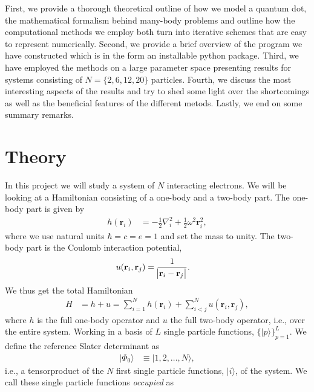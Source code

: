 \documentclass[
    a4paper, aps, twocolumn, floatfix, superscriptaddress,
    nofootinbib]{revtex4-1}
\newcommand{\vf}{\mathbf}
\newcommand{\1}{\mathds{1}}
\newcommand{\half}{\frac{1}{2}}
\newcommand{\ket}[1]{\rvert #1\rangle}
\begin{document}
    First, we provide a thorough theoretical outline of how we model a quantum dot, 
    the mathematical formalism behind many-body problems and outline how the 
    computational methods we employ both turn into iterative schemes that are 
    easy to represent numerically. Second, we provide a brief overview of the
    program we have constructed which is in the form an installable python package.
    Third, we have employed the methods on a large parameter space presenting 
    results for systems consisting of $N= \{2, 6, 12, 20\}$ particles. Fourth,
    we discuss the most interesting aspects of the results and try to shed some
    light over the shortcomings as well as the beneficial features of the different
    metods. Lastly, we end on some summary remarks. 

\section{Theory}
    In this project we will study a system of $N$ interacting electrons. We will
    be looking at a Hamiltonian consisting of a one-body and a two-body part.
    The one-body part is given by
    \begin{align}
        h(\vf{r}_i)
        &= -\half\nabla_i^2 + \half\omega^2 \vf{r}_i^2,
        \label{eq:one_body_hamiltonian}
    \end{align}
    where we use natural units $\hbar = c = e = 1$ and set the mass to unity.
    The two-body part is the Coulomb interaction potential,
    \begin{align}
        u(\vf{r}_i, \vf{r}_j)
        &= \frac{1}{\abs{\vf{r}_i - \vf{r}_j}}.
        \label{eq:two_body_operator}
    \end{align}
    We thus get the total Hamiltonian
    \begin{align}
        H &= h + u
        =
        \sum_{i = 1}^N h(\vf{r}_i) + \sum_{i < j}^N u(\vf{r}_i, \vf{r}_j),
    \end{align}
    where $h$ is the full one-body operator and $u$ the full two-body
    operator, i.e., over the entire system.  Working in a basis of $L$ single
    particle functions, $\{\ket{p}\}_{p = 1}^L$. We define the reference Slater
    determinant as
    \begin{align}
        \ket{\Phi_0} &\equiv \ket{1, 2, \dots, N},
    \end{align}
    i.e., a tensorproduct of the $N$ first single particle functions, $\ket{i}$,
    of the system. We call these single particle functions \emph{occupied} as
\end{document}
